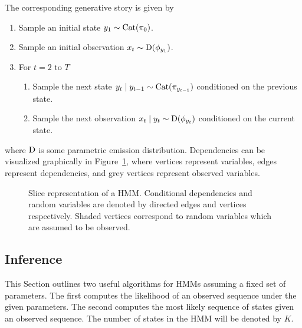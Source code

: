 \documentclass[12pt]{report}
\newcommand{\1}[0]{\mathbbm{1}}
\newcommand{\Cat}[0]{\textnormal{Cat}}
\newcommand{\SomeDist}[0]{\textnormal{D}}
\begin{document}
The corresponding generative story is given by

\begin{enumerate}
    \item Sample an initial state $y_1 \sim \Cat(\pi_0)$.
    \item Sample an initial observation $x_t \sim \SomeDist(\phi_{y_1})$.
    \item For $t = 2$ to $T$
    \begin{enumerate}
        \item Sample the next state $y_{t} \mid y_{t-1} \sim \Cat(\pi_{y_{t-1}})$ conditioned on the previous state.
        \item Sample the next observation $x_t \mid y_t \sim \SomeDist(\phi_{y_t})$ conditioned on the current state.
    \end{enumerate}
\end{enumerate}

where $\SomeDist$ is some parametric emission distribution.
Dependencies can be visualized graphically in Figure~\ref{fig:hmm},
where vertices represent variables, edges represent dependencies,
and grey vertices represent observed variables.

\begin{figure}[ht!]
    \centering
    \caption[Slice representation of a HMM]{
        Slice representation of a HMM.
        Conditional dependencies and random variables are denoted by
        directed edges and vertices respectively. Shaded vertices correspond
        to random variables which are assumed to be observed.
    }
    \label{fig:hmm}
\end{figure}

\subsection{Inference}
This Section outlines two useful algorithms for \acp{HMM}
assuming a fixed set of parameters. The first computes the
likelihood of an observed sequence under the given parameters.
The second computes the most likely sequence of states given
an observed sequence. The number of states in the \ac{HMM} will
be denoted by $K$.
\end{document}
